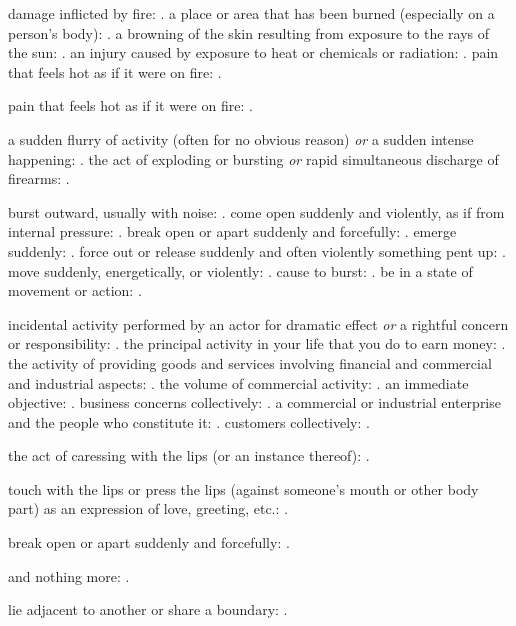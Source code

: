   damage inflicted by fire: . a place or area that has been burned (especially on a person's body): . a browning of the skin resulting from exposure to the rays of the sun: . an injury caused by exposure to heat or chemicals or radiation: . pain that feels hot as if it were on fire: .

  pain that feels hot as if it were on fire: .

  a sudden flurry of activity (often for no obvious reason) \textit{or} a sudden intense happening: . the act of exploding or bursting \textit{or} rapid simultaneous discharge of firearms: .

  burst outward, usually with noise: . come open suddenly and violently, as if from internal pressure: . break open or apart suddenly and forcefully: . emerge suddenly: . force out or release suddenly and often violently something pent up: . move suddenly, energetically, or violently: . cause to burst: . be in a state of movement or action: .

  incidental activity performed by an actor for dramatic effect \textit{or} a rightful concern or responsibility: . the principal activity in your life that you do to earn money: . the activity of providing goods and services involving financial and commercial and industrial aspects: . the volume of commercial activity: . an immediate objective: . business concerns collectively: . a commercial or industrial enterprise and the people who constitute it: . customers collectively: .

  the act of caressing with the lips (or an instance thereof): .

  touch with the lips or press the lips (against someone's mouth or other body part) as an expression of love, greeting, etc.: .

  break open or apart suddenly and forcefully: .

  and nothing more: .

  lie adjacent to another or share a boundary: .

